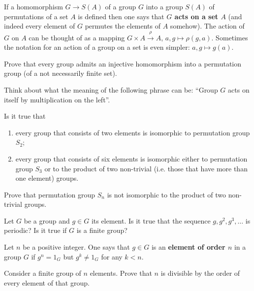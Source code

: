 \documentclass[12pt]{article}
\begin{document}
\begin{opredelenie}
  If a homomorphism $G \to S(A)$ of a group $G$ into a group $S(A)$ of
  permutations of a set $A$ is defined then one says that {\bf $G$
    acts on a set $A$} (and indeed every element of $G$ permutes the
  elements of $A$ somehow). The action of $G$ on $A$ can be thought of
  as a mapping $G \times A \overset{\rho}{\to} A$, $a, g \mapsto
  \rho(g, a)$. Sometimes the notation for an action of a group on a set
  is even simpler: $a, g \mapsto g(a)$.
\end{opredelenie}

\begin{zadacha} Prove that every group admits an injective
  homomorphism into a permutation group (of a not necessarily finite
  set).
\end{zadacha}

\begin{ukazanie} Think about what the meaning of the following phrase
  can be: ``Group $G$ acts on itself by multiplication on the left''.
\end{ukazanie}

\begin{zadacha} Is it true that
\begin{enumerate}
\item every group that consists of two elements is isomorphic to 
  permutation group $S_2$;
\item every group that consists of six elements is isomorphic either
  to permutation group $S_3$ or to the product of two non-trivial
  (i.e. those that have more than one element) groups.
\end{enumerate}
\end{zadacha}

\begin{zadacha}[*] Prove that permutation group $S_n$ is not
  isomorphic to the product of two non-trivial groups.
\end{zadacha}

\begin{zadacha}
Let $G$ be a group and $g \in G$ its element. Is it true that the
sequence $g,g^2,g^3,\dots$ is periodic? Is it true if  $G$ is a finite
group?
\end{zadacha}

Let $n$ be a positive integer. One says that $g \in G$ is an {\bf
element of order $n$} in a group $G$ if $g^n = 1_G$ but $g^k \neq 1_G$
for any $k < n$.

\begin{zadacha}[!]
Consider a finite group of $n$ elements. Prove that $n$ is divisible
by the order of every element of that group.
\end{zadacha}
\end{document}
